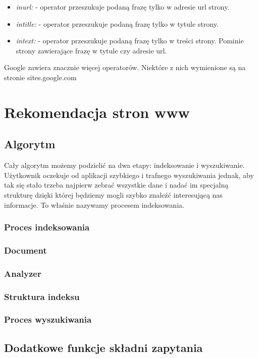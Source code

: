 \documentclass[licencjacka]{pracadypl}
\theoremstyle{definition}
\begin{document}
\begin{itemize}
	\item \emph{inurl:} - operator przeszukuje podaną frazę tylko w adresie url strony.
		
	\item \emph{intitle:} - operator przeszukuje podaną frazę tylko w tytule strony.
	
	\item \emph{intext:} - operator przeszukuje podaną frazę tylko w treści strony. Pominie strony zawierające frazę w tytule czy adresie url.
	
\end{itemize}

Google zawiera znacznie więcej operatorów. Niektóre z nich wymienione są na stronie sites.google.com \cite{operatory-google}

\chapter{Rekomendacja stron www}
\section{Algorytm}
Cały algorytm możemy podzielić na dwa etapy: indeksowanie i wyszukiwanie.
Użytkownik oczekuje od aplikacji szybkiego i trafnego wyszukiwania jednak, aby tak się stało trzeba najpierw zebrać wszystkie dane i nadać im specjalną strukturę dzięki której będziemy mogli szybko znaleźć interesującą nas informacje. To właśnie nazywamy procesem indeksowania.
\subsection{Proces indeksowania}
\subsection*{Document}
\subsection*{Analyzer}
\subsection*{Struktura indeksu}
\subsection{Proces wyszukiwania}
\section{Dodatkowe funkcje składni zapytania}
\end{document}
